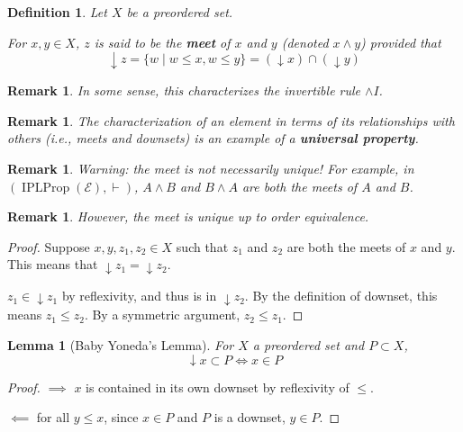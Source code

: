 \documentclass[12pt]{article}
\newtheorem{lemma}[theorem]{Lemma}
\newtheorem{definition}[theorem]{Definition}
\newtheorem{remark}[theorem]{Remark}
\begin{document}
\begin{definition}
Let $X$ be a preordered set.

For $x, y \in X$, $z$ is said to be the \textbf{meet} of $x$ and $y$ (denoted $x \land y$) provided that 
\[\downarrow z = \{w \mid w \leq x, w \leq y\} = (\downarrow x) \cap (\downarrow y)\]
\end{definition}

\begin{remark}
In some sense, this characterizes the invertible rule $\land I$.
\end{remark}

\begin{remark}
The characterization of an element in terms of its relationships with others (i.e., meets and downsets) is an example of a \textbf{universal property}.
\end{remark}

\begin{remark}
Warning: the meet is not necessarily unique! For example, in \\$(\operatorname{IPLProp}(\mathcal{E}), \vdash)$, $A \land B$ and $B \land A$ are both the meets of $A$ and $B$.
\end{remark}

\begin{remark}
However, the meet is unique up to order equivalence.
\end{remark}
\begin{proof}
Suppose $x, y, z_1, z_2 \in X$ such that $z_1$ and $z_2$ are both the meets of $x$ and $y$. This means that $\downarrow z_1 = \downarrow z_2$.

$z_1 \in \downarrow z_1$ by reflexivity, and thus is in $\downarrow z_2$. By the definition of downset, this means $z_1 \leq z_2$. By a symmetric argument, $z_2 \leq z_1$.
\end{proof}

\begin{lemma}[Baby Yoneda's Lemma]
For $X$ a preordered set and $P \subset X$,
\[
\downarrow x \subset P \iff x \in P
\]
\end{lemma}
\begin{proof}
$\implies$ $x$ is contained in its own downset by reflexivity of $\leq$.

$\impliedby$ for all $y \leq x$, since $x \in P$ and $P$ is a downset, $y \in P$.
\end{proof}
\end{document}

